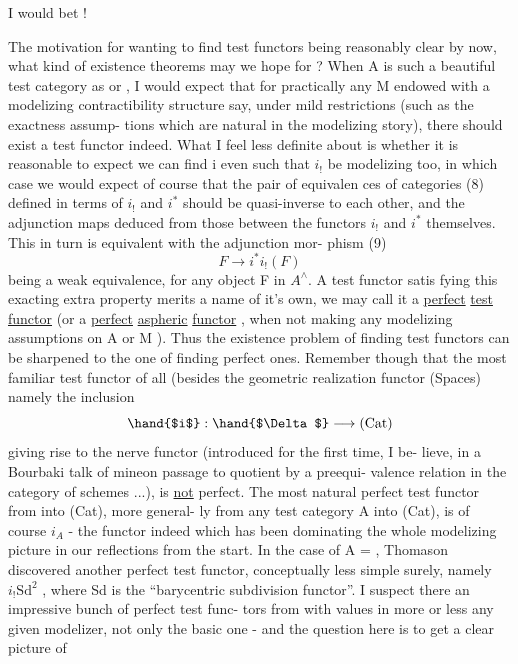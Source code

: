 
I would bet !

The motivation for wanting to find test functors being reasonably
clear by now,  what kind of existence theorems may we hope for ? When
A is such a beautiful test category as \hand{$\Delta$,$\Box$} or \hand{$\bigcirc$} ,  I would expect
that for practically any M endowed with a modelizing contractibility
structure say,  under mild  restrictions  (such as the exactness assump-%
tions which are natural in the modelizing story),  there should exist a
test functor indeed.  What I feel less definite about is whether it is
reasonable to expect we can find i even such that $i_{!}$ be modelizing too,
in which case we would expect of course that the pair of  equivalen%
ces of categories
(8)
defined in terms of $i_{!}$ and $i^{*}$ should be quasi-inverse to each other,
and the adjunction maps deduced from those between the functors $i_{!}$ and
$i^{*}$ themselves.  This  in turn is equivalent with the adjunction mor-%
phism
(9)
\[ F \longrightarrow i^{*}i_{!}(F) \]
being a weak equivalence,  for any object F in $A^{\wedge}$.  A test functor satis%
fying this exacting extra property merits a name of it's own,  we may
call it a \uline{perfect} \uline{test} \uline{functor}  (or a \uline{perfect} \uline{aspheric} \uline{functor} ,  when
not making any modelizing assumptions on A or M ).  Thus the existence
problem of finding test functors can be sharpened to the one of finding
perfect ones.  Remember though that the  most familiar test
functor of all (besides the geometric realization functor \hand{$\Delta\to$}(Spaces)\hand{),}
namely the inclusion
\[ \hand{$i$} : \hand{$\Delta$} \longrightarrow \text{(Cat)} \]
giving rise to the nerve functor (introduced for the first time,  I be-%
lieve,  in a Bourbaki talk of mine\hand{,}on passage to quotient by a preequi-%
valence relation in the category of schemes ...),  is  \uline{not} perfect.
The most natural perfect test functor from \hand{$\Delta$} into (Cat),  more general-%
ly from any  test category A  into (Cat),  is of course  $i_A$  -  the
functor indeed which has been dominating the whole modelizing picture
in our reflections from the start.  In the case of A = \hand{$\Delta$},  Thomason
discovered another  perfect test functor,  conceptually less simple
surely,  namely  $i_{!}\mathrm{Sd}^{2}$ ,  where Sd is the ``barycentric subdivision
functor''.  I suspect there   an impressive bunch of perfect test func-%
tors from \hand{$\Delta$} with values in more or less any given modelizer,  not only
the basic one  -  and the question here is to get a clear picture of

